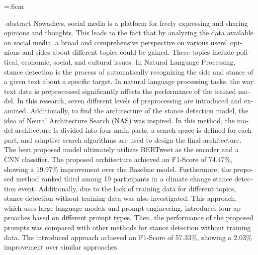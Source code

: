 
\baselineskip=.6cm
\begin{latin}

\en-abstract{
Nowadays, social media is a platform for freely expressing and sharing opinions and thoughts. This leads to the fact that by analyzing the data available on social media, a broad and comprehensive perspective on various users’ opinions and sides about different topics could be gained. These topics include political, economic, social, and cultural issues. In Natural Language Processing, stance detection is the process of automatically recognizing the side and stance of a given text about a
specific target. 
\newline
In natural language processing tasks, the way text data is preprocessed significantly affects the performance of the trained model. In this research, seven different levels of preprocessing are introduced and examined. Additionally, to find the architecture of the stance detection model, the idea of Neural Architecture Search (NAS) was inspired. In this method, the model architecture is divided into four main parts, a search space is defined for each part, and adaptive search algorithms are used to design the final architecture. The best proposed model ultimately utilizes BERTweet as the encoder and a CNN classifier. The proposed architecture achieved an F1-Score of 74.47\%, showing a 19.97\% improvement over the Baseline model. Furthermore, the proposed method ranked third among 19 participants in a climate change stance detection event. Additionally, due to the lack of training data for different topics, stance detection without training data was also investigated. This approach, which uses large language models and prompt engineering, introduces four approaches based on different prompt types. Then, the performance of the proposed prompts was compared with other methods for stance detection without training data. The introduced approach achieved an F1-Score of 57.33\%, showing a 2.03\% improvement over similar approaches.}
\latinfirstPage
\end{latin}
